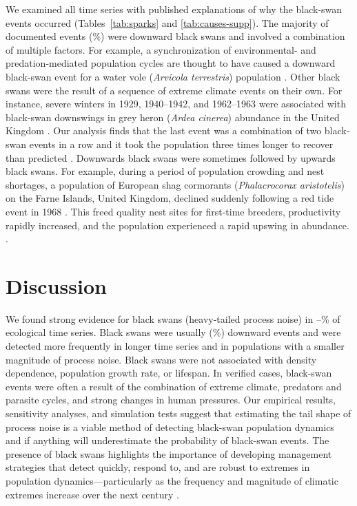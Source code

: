We examined all time series with published explanations of why the black-swan
events occurred (Tables~\ref{tab:sparks} and \ref{tab:causes-supp}). The
majority of documented events (\percBSDown \%) were downward black swans and
involved a combination of multiple factors. For example, a synchronization of
environmental- and predation-mediated population cycles are thought to have
caused a downward black-swan event for a water vole (\textit{Arvicola
  terrestris}) population \citep{saucy1994}. Other black swans were the result
of a sequence of extreme climate events on their own. For instance, severe
winters in 1929, 1940--1942, and 1962--1963 were associated with black-swan
downswings in grey heron (\textit{Ardea cinerea}) abundance in the United
Kingdom \citep{stafford1971}. Our analysis finds that the last event was a
combination of two black-swan events in a row and it took the population three
times longer to recover than predicted \citep{stafford1971}. Downwards black
swans were sometimes followed by upwards black swans. For example, during a
period of population crowding and nest shortages, a population of European
shag cormorants (\textit{Phalacrocorax aristotelis}) on the Farne Islands,
United Kingdom, declined suddenly following a red tide event in 1968
\citep{potts1980}. This freed quality nest sites for first-time breeders,
productivity rapidly increased, and the population experienced a rapid upswing
in abundance. \citep{potts1980}.

\section{Discussion}

We found strong evidence for black swans (heavy-tailed process noise) in
\overallMinPerc--\overallMaxPerc\% of ecological time series. Black swans were
usually (\percBSDown \%) downward events and were detected more frequently in
longer time series and in populations with a smaller magnitude of process
noise. Black swans were not associated with density dependence, population
growth rate, or lifespan. In verified cases, black-swan events were often a
result of the combination of extreme climate, predators and parasite cycles,
and strong changes in human pressures. Our empirical results, sensitivity
analyses, and simulation tests suggest that estimating the tail shape of
process noise is a viable method of detecting black-swan population dynamics
and if anything will underestimate the probability of black-swan events. The
presence of black swans highlights the importance of developing management
strategies that detect quickly, respond to, and are robust to extremes in
population dynamics---particularly as the frequency and magnitude of climatic
extremes increase over the next century \citep{easterling2000,ipcc2012}.

